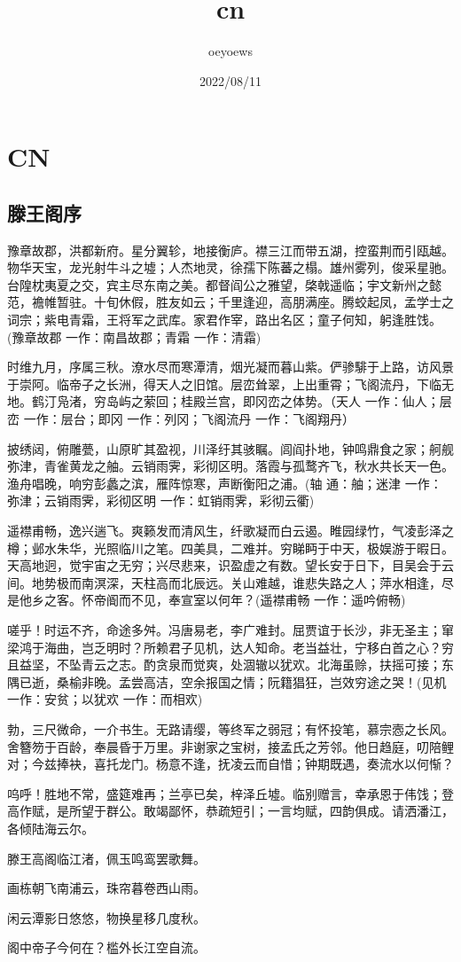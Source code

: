 \documentclass[UTF8]{article}
\title{cn \emoji{rocket}}
\author{oeyoews}
\date{2022/08/11}
\begin{document}
\maketitle

\section{CN}%
\label{sec:CN}

\subsection{滕王阁序}%
\label{sec:滕王阁序}

豫章故郡，洪都新府。星分翼轸，地接衡庐。襟三江而带五湖，控蛮荆而引瓯越。物华天宝，龙光射牛斗之墟；人杰地灵，徐孺下陈蕃之榻。雄州雾列，俊采星驰。台隍枕夷夏之交，宾主尽东南之美。都督阎公之雅望，棨戟遥临；宇文新州之懿范，襜帷暂驻。十旬休假，胜友如云；千里逢迎，高朋满座。腾蛟起凤，孟学士之词宗；紫电青霜，王将军之武库。家君作宰，路出名区；童子何知，躬逢胜饯。(豫章故郡 一作：南昌故郡；青霜 一作：清霜)

时维九月，序属三秋。潦水尽而寒潭清，烟光凝而暮山紫。俨骖騑于上路，访风景于崇阿。临帝子之长洲，得天人之旧馆。层峦耸翠，上出重霄；飞阁流丹，下临无地。鹤汀凫渚，穷岛屿之萦回；桂殿兰宫，即冈峦之体势。（天人 一作：仙人；层峦 一作：层台；即冈 一作：列冈；飞阁流丹 一作：飞阁翔丹）

披绣闼，俯雕甍，山原旷其盈视，川泽纡其骇瞩。闾阎扑地，钟鸣鼎食之家；舸舰弥津，青雀黄龙之舳。云销雨霁，彩彻区明。落霞与孤鹜齐飞，秋水共长天一色。渔舟唱晚，响穷彭蠡之滨，雁阵惊寒，声断衡阳之浦。(轴 通：舳；迷津 一作：弥津；云销雨霁，彩彻区明 一作：虹销雨霁，彩彻云衢)

遥襟甫畅，逸兴遄飞。爽籁发而清风生，纤歌凝而白云遏。睢园绿竹，气凌彭泽之樽；邺水朱华，光照临川之笔。四美具，二难并。穷睇眄于中天，极娱游于暇日。天高地迥，觉宇宙之无穷；兴尽悲来，识盈虚之有数。望长安于日下，目吴会于云间。地势极而南溟深，天柱高而北辰远。关山难越，谁悲失路之人；萍水相逢，尽是他乡之客。怀帝阍而不见，奉宣室以何年？(遥襟甫畅 一作：遥吟俯畅)

嗟乎！时运不齐，命途多舛。冯唐易老，李广难封。屈贾谊于长沙，非无圣主；窜梁鸿于海曲，岂乏明时？所赖君子见机，达人知命。老当益壮，宁移白首之心？穷且益坚，不坠青云之志。酌贪泉而觉爽，处涸辙以犹欢。北海虽赊，扶摇可接；东隅已逝，桑榆非晚。孟尝高洁，空余报国之情；阮籍猖狂，岂效穷途之哭！(见机 一作：安贫；以犹欢 一作：而相欢)

勃，三尺微命，一介书生。无路请缨，等终军之弱冠；有怀投笔，慕宗悫之长风。舍簪笏于百龄，奉晨昏于万里。非谢家之宝树，接孟氏之芳邻。他日趋庭，叨陪鲤对；今兹捧袂，喜托龙门。杨意不逢，抚凌云而自惜；钟期既遇，奏流水以何惭？

呜呼！胜地不常，盛筵难再；兰亭已矣，梓泽丘墟。临别赠言，幸承恩于伟饯；登高作赋，是所望于群公。敢竭鄙怀，恭疏短引；一言均赋，四韵俱成。请洒潘江，各倾陆海云尔。

滕王高阁临江渚，佩玉鸣鸾罢歌舞。

画栋朝飞南浦云，珠帘暮卷西山雨。

闲云潭影日悠悠，物换星移几度秋。

阁中帝子今何在？槛外长江空自流。
\end{document}
